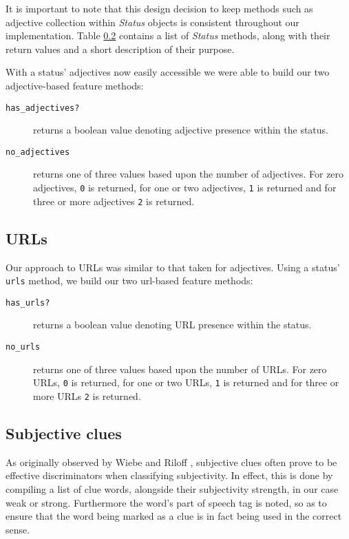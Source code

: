 It is important to note that this design decision to keep methods such as adjective collection within \emph{Status} objects is consistent throughout our implementation. Table \ref{} contains a list of \emph{Status} methods, along with their return values and a short description of their purpose.

With a status' adjectives now easily accessible we were able to build our two adjective-based feature methods:

\begin{description}
	\item [\texttt{has\_adjectives?}] returns a boolean value denoting adjective presence within the status.
	\item [\texttt{no\_adjectives}] returns one of three values based upon the number of adjectives. For zero adjectives, \texttt{0} is returned, for one or two adjectives, \texttt{1} is returned and for three or more adjectives \texttt{2} is returned.
\end{description}

\subsection{URLs}

Our approach to URLs was similar to that taken for adjectives. Using a status' \texttt{urls} method, we build our two url-based feature methods:

\begin{description}
	\item [\texttt{has\_urls?}] returns a boolean value denoting URL presence within the status.
	\item [\texttt{no\_urls}] returns one of three values based upon the number of URLs. For zero URLs, \texttt{0} is returned, for one or two URLs, \texttt{1} is returned and for three or more URLs \texttt{2} is returned.
\end{description}

\subsection{Subjective clues}

As originally observed by Wiebe and Riloff \cite{Wiebe:2000ub}, subjective clues often prove to be effective discriminators when classifying subjectivity. In effect, this is done by compiling a list of clue words, alongside their subjectivity strength, in our case weak or strong. Furthermore the word's part of speech tag is noted, so as to ensure that the word being marked as a clue is in fact being used in the correct sense.


